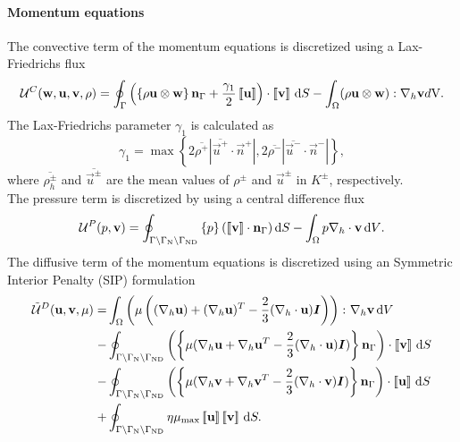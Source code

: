 \paragraph{Momentum equations}
The convective term of the momentum equations is discretized using a Lax-Friedrichs flux
\begin{equation}
	\mathcal{U}^C(\textbf{w},\textbf{u},\textbf{v}, \rho)=  \oint_{\Gamma}{\left( \left\{{\rho\textbf{u}\otimes\textbf{w} }\right\}\textbf{n}_\Gamma + \frac{\gamma_1}{2}\left[\!\left[{{\textbf{u}}}\right]\!\right]\right)\cdot\left[\!\left[{{\textbf{v}}}\right]\!\right] \,\mathrm{d} S}
	-\int_{\Omega}({\rho\textbf{u}\otimes\textbf{w}}):\nabla_h\textbf{v} d\text{V}.
	\label{eq:Mom_convective}\\
\end{equation}
The Lax-Friedrichs parameter $\gamma_1$ is calculated as \textcite{kleinHighorderDiscontinuousGalerkin2016}
\begin{equation}
	\gamma_1  = \max \left\{2 \overline{\rho^+} |\overline{\vec{u}^+} \cdot \vec{n}^+|,2 \overline{\rho^-} |\overline{\vec{u}^-} \cdot \vec{n}^-|\right\},
	\label{eq:vardens_lambda}
\end{equation}
where $\overline{\rho_{h}^\pm}$ and $\overline{\vec{u}^\pm}$ are the mean values of $\rho^\pm$ and $\vec{u}^\pm$ in $K^\pm$, respectively.\\
The pressure term is discretized by using a central difference flux
\begin{equation}
	\mathcal{U}^P(p,\textbf{v})=  \oint_{\Gamma \setminus \Gamma_{\text{N}}\setminus \Gamma_{\text{ND}}}{ \left\{{p}\right\}(\left[\!\left[{{\textbf{v}}}\right]\!\right]\cdot \textbf{n}_\Gamma  )\,\mathrm{d} S}
	- \int_{\Omega}{p \nabla_h \cdot \textbf{v} \,\mathrm{d} V}. \label{eq:Mom_pressure}
\end{equation}
The diffusive term of the momentum equations is discretized using an Symmetric Interior Penalty (SIP)  formulation \parencite{shahbaziExplicitExpressionPenalty2005}
\begin{equation}
	\begin{aligned}
		\tilde{\mathcal{U}}^D(\vec{u},\vec{v},\mu) =
		  & \int_{\Omega}{\left(\mu\left((\nabla_h \vec{u}) + (\nabla_h \vec{u})^T - \frac{2}{3}(\nabla_h\cdot \vec{u})\mytensor{I} \right)\right)\colon \nabla_h\vec{v}} \dV \\
		- & \oint_{\Gamma \setminus \Gamma_{\text{N}}\setminus \Gamma_{\text{ND}}}
		\left(\mean{\mu(\nabla_h\vec{u} + \nabla_h\vec{u}^T - \frac{2}{3}(\nabla_h\cdot \vec{u})\mytensor{I})}\normalBoundary\right)\cdot\jump{\vec{v}}\dS                    \\
		- & \oint_{\Gamma \setminus \Gamma_{\text{N}}\setminus \Gamma_{\text{ND}}}
		\left(\mean{\mu(\nabla_h\vec{v} + \nabla_h\vec{v}^T - \frac{2}{3}(\nabla_h\cdot \vec{v})\mytensor{I})}\normalBoundary\right)\cdot\jump{\vec{u}} \dS                   \\
		+ & \oint_{\Gamma \setminus \Gamma_{\text{N}}\setminus \Gamma_{\text{ND}}} \eta \mu_{\text{max}} \jump{\vec{u}} \jump{\vec{v}}\dS.
		\label{eq:Mom_diffusive}
	\end{aligned}
\end{equation}
